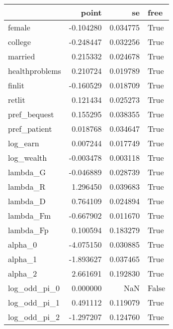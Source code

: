 \begin{tabular}{lrrl}
\toprule
{} &     point &        se &   free \\
\midrule
female         & -0.104280 &  0.034775 &   True \\
college        & -0.248447 &  0.032256 &   True \\
married        &  0.215332 &  0.024678 &   True \\
healthproblems &  0.210724 &  0.019789 &   True \\
finlit         & -0.160529 &  0.018709 &   True \\
retlit         &  0.121434 &  0.025273 &   True \\
pref\_bequest   &  0.155295 &  0.038355 &   True \\
pref\_patient   &  0.018768 &  0.034647 &   True \\
log\_earn       &  0.007244 &  0.017749 &   True \\
log\_wealth     & -0.003478 &  0.003118 &   True \\
lambda\_G       & -0.046889 &  0.028739 &   True \\
lambda\_R       &  1.296450 &  0.039683 &   True \\
lambda\_D       &  0.764109 &  0.024894 &   True \\
lambda\_Fm      & -0.667902 &  0.011670 &   True \\
lambda\_Fp      &  0.100594 &  0.183279 &   True \\
alpha\_0        & -4.075150 &  0.030885 &   True \\
alpha\_1        & -1.893627 &  0.037465 &   True \\
alpha\_2        &  2.661691 &  0.192830 &   True \\
log\_odd\_pi\_0   &  0.000000 &       NaN &  False \\
log\_odd\_pi\_1   &  0.491112 &  0.119079 &   True \\
log\_odd\_pi\_2   & -1.297207 &  0.124760 &   True \\
\bottomrule
\end{tabular}

